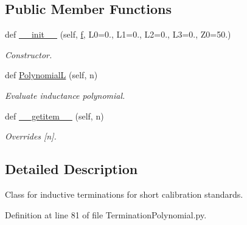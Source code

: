 \subsection*{Public Member Functions}
\begin{DoxyCompactItemize}
\item 
def \hyperlink{classSignalIntegrity_1_1Measurement_1_1CalKit_1_1Standards_1_1TerminationPolynomial_1_1TerminationLPolynomial_a303b1dbfa2c0490e6e89fbeb96b3b388}{\+\_\+\+\_\+init\+\_\+\+\_\+} (self, \hyperlink{classSignalIntegrity_1_1SParameters_1_1SParameters_1_1SParameters_a32e7a34d6837fe949b413c852a0447f8}{f}, L0=0., L1=0., L2=0., L3=0., Z0=50.)
\begin{DoxyCompactList}\small\item\em Constructor. \end{DoxyCompactList}\item 
def \hyperlink{classSignalIntegrity_1_1Measurement_1_1CalKit_1_1Standards_1_1TerminationPolynomial_1_1TerminationLPolynomial_a23845d1c2e68be54864a11c6127f5004}{PolynomialL} (self, n)
\begin{DoxyCompactList}\small\item\em Evaluate inductance polynomial. \end{DoxyCompactList}\item 
def \hyperlink{classSignalIntegrity_1_1Measurement_1_1CalKit_1_1Standards_1_1TerminationPolynomial_1_1TerminationLPolynomial_ab7a6da5139e0878b590d68292aaa70f2}{\+\_\+\+\_\+getitem\+\_\+\+\_\+} (self, n)
\begin{DoxyCompactList}\small\item\em Overrides \mbox{[}n\mbox{]}. \end{DoxyCompactList}\end{DoxyCompactItemize}


\subsection{Detailed Description}
Class for inductive terminations for short calibration standards. 

Definition at line 81 of file Termination\+Polynomial.\+py.




